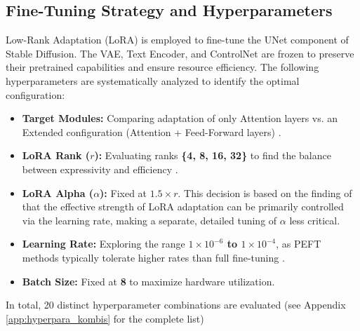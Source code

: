 \subsection{Fine-Tuning Strategy and Hyperparameters}\label{sec:feintuning_strategie}
Low-Rank Adaptation (LoRA) \cite{HU2021} is employed to fine-tune the UNet component of Stable Diffusion. The VAE, Text Encoder, and ControlNet are frozen to preserve their pretrained capabilities and ensure resource efficiency.
The following hyperparameters are systematically analyzed to identify the optimal configuration:
\begin{itemize}
    \item \textbf{Target Modules:} Comparing adaptation of only Attention layers vs. an Extended configuration (Attention + Feed-Forward layers) \cite{dettmers2023qloraefficientfinetuningquantized}.
    \item \textbf{LoRA Rank ($r$):} Evaluating ranks \textbf{\{4, 8, 16, 32\}} to find the balance between expressivity and efficiency \cite{HU2021}.
    \item \textbf{LoRA Alpha ($\alpha$):} Fixed at $1.5 \times r$. This decision is based on the finding of \citet[p. 4]{HU2021} that the effective strength of LoRA adaptation can be primarily controlled via the learning rate, making a separate, detailed tuning of $\alpha$ less critical.
    \item \textbf{Learning Rate:} Exploring the range \textbf{$1 \times 10^{-6}$ to $1 \times 10^{-4}$}, as PEFT methods typically tolerate higher rates than full fine-tuning \cite{zhang2025parameter}.
    \item \textbf{Batch Size:} Fixed at \textbf{8} to maximize hardware utilization.
\end{itemize}
In total, 20 distinct hyperparameter combinations are evaluated (see Appendix \ref{app:hyperpara_kombis} for the complete list)